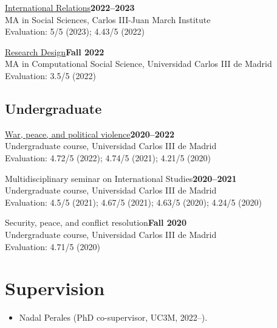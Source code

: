 \documentclass[a4paper, 12pt]{article}
\begin{document}
\noindent
\href{https://raw.githack.com/franvillamil/syllabi/master/current/syllabus_IR.pdf}{International Relations}\hfill\textbf{2022--2023}\\
{\small MA in Social Sciences, Carlos III-Juan March Institute}\\
{\small Evaluation: 5/5 (2023); 4.43/5 (2022)}
\vspace{10pt}

\noindent
\href{https://github.com/franvillamil/syllabi/blob/master/current/syllabus_research_design.pdf}{Research Design}\hfill\textbf{Fall 2022}\\
{\small MA in Computational Social Science, Universidad Carlos III de Madrid}\\
{\small Evaluation: 3.5/5 (2022)}

\subsection*{Undergraduate}

\noindent
\href{https://github.com/franvillamil/syllabi/blob/master/current/syllabus_war_peace_political_violence.pdf}{War, peace, and political violence}\hfill\textbf{2020--2022}\\
{\small Undergraduate course, Universidad Carlos III de Madrid}\\
{\small Evaluation: 4.72/5 (2022); 4.74/5 (2021); 4.21/5 (2020)}
\vspace{10pt}

\noindent
Multidisciplinary seminar on International Studies\hfill\textbf{2020--2021}\\
{\small Undergraduate course, Universidad Carlos III de Madrid}\\
{\small Evaluation: 4.5/5 (2021); 4.67/5 (2021); 4.63/5 (2020); 4.24/5 (2020)}
\vspace{10pt}

\noindent
Security, peace, and conflict resolution\hfill\textbf{Fall 2020}\\
{\small Undergraduate course, Universidad Carlos III de Madrid}\\
{\small Evaluation: 4.71/5 (2020)}

\section*{Supervision}

\begin{itemize}[leftmargin=*, nolistsep]
	\item Nadal Perales (PhD co-supervisor, UC3M, 2022--).
\end{itemize}
\end{document}
